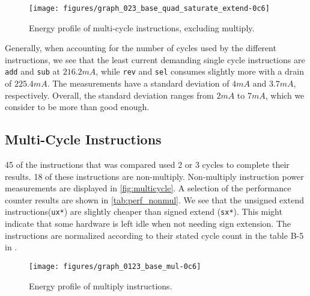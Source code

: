 \begin{figure}
    \centering
    \texttt{[image: figures/graph\_023\_base\_quad\_saturate\_extend-0c6]}
    \caption{Energy profile of multi-cycle instructions, excluding multiply.}
    \label{fig:multicycle}
\end{figure}

Generally, when accounting for the number of cycles used by the different
instructions, we see that the least current demanding single cycle instructions
are \texttt{add} and \texttt{sub} at $216.2mA$, while \texttt{rev} and
\texttt{sel} consumes slightly more with a drain of $225.4mA$. The measurements
have a standard deviation of $4mA$ and $3.7mA$, respectively. Overall, the
standard deviation ranges from $2mA$ to $7mA$, which we consider to be more than
good enough.

\subsection{Multi-Cycle Instructions}


45 of the instructions that was compared used 2 or 3 cycles to complete their
results. 18 of these instructions are non-multiply. Non-multiply
instruction power measurements are displayed in \autoref{fig:multicycle}. A
selection of the performance counter results are shown in
\autoref{tab:perf_nonmul}. We see that the unsigned extend
instructions(\texttt{ux*}) are
slightly cheaper than signed extend (\texttt{sx*}). This might indicate that
some hardware is left idle when not needing sign extension.  The instructions
are normalized according to their stated cycle count in the table B-5 in
\cite{armtech}.

\begin{figure*}
    \centering
    \texttt{[image: figures/graph\_0123\_base\_mul-0c6]}
    \caption{Energy profile of multiply instructions.}
    \label{fig:allmul}
\end{figure*}

